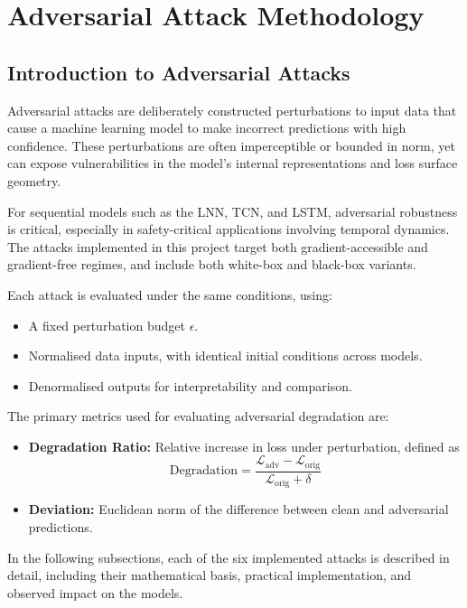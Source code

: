 \chapter{Adversarial Attack Methodology}

\section{Introduction to Adversarial Attacks}

Adversarial attacks are deliberately constructed perturbations to input data that cause a machine learning model to make incorrect predictions with high confidence. These perturbations are often imperceptible or bounded in norm, yet can expose vulnerabilities in the model’s internal representations and loss surface geometry.

For sequential models such as the LNN, TCN, and LSTM, adversarial robustness is critical, especially in safety-critical applications involving temporal dynamics. The attacks implemented in this project target both gradient-accessible and gradient-free regimes, and include both white-box and black-box variants.

Each attack is evaluated under the same conditions, using:
\begin{itemize}
    \item A fixed perturbation budget $\epsilon$.
    \item Normalised data inputs, with identical initial conditions across models.
    \item Denormalised outputs for interpretability and comparison.
\end{itemize}

\noindent The primary metrics used for evaluating adversarial degradation are:
\begin{itemize}
    \item \textbf{Degradation Ratio:} Relative increase in loss under perturbation, defined as
    \[
    \text{Degradation} = \frac{\mathcal{L}_{\text{adv}} - \mathcal{L}_{\text{orig}}}{\mathcal{L}_{\text{orig}} + \delta}
    \]
    \item \textbf{Deviation:} Euclidean norm of the difference between clean and adversarial predictions.
\end{itemize}

In the following subsections, each of the six implemented attacks is described in detail, including their mathematical basis, practical implementation, and observed impact on the models.

